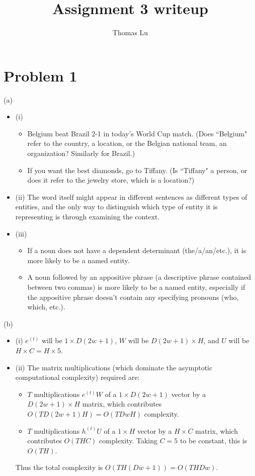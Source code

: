 \documentclass{article}
\title{Assignment 3 writeup}
\author{Thomas Lu}
\date{}
\begin{document}
\maketitle
\section{Problem 1}
(a)

\begin{itemize}
\item (i) 
\begin{itemize}
\item Belgium beat Brazil 2-1 in today's World Cup match. (Does ``Belgium" refer to the country, a location, or the Belgian national team, an organization? Similarly for Brazil.)
\item If you want the best diamonds, go to Tiffany. (Is ``Tiffany" a person, or does it refer to the jewelry store, which is a location?)
\end{itemize}
\item (ii) The word itself might appear in different sentences as different types of entities, and the only way to distinguish which type of entity it is representing is through examining the context.
\item (iii)
\begin{itemize}
\item If a noun does not have a dependent determinant (the/a/an/etc.), it is more likely to be a named entity.
\item A noun followed by an appositive phrase (a descriptive phrase contained between two commas) is more likely to be a named entity, especially if the appositive phrase doesn't contain any specifying pronouns (who, which, etc.).
\end{itemize}
\end{itemize}

(b)

\begin{itemize}
\item (i) $e^{(t)}$ will be $1 \times D(2w + 1)$, $W$ will be $D(2w+1) \times H$, and $U$ will be $H \times C = H \times 5$.
\item (ii) The matrix multiplications (which dominate the asymptotic computational complexity) required are:
\begin{itemize}
\item $T$ multiplications $e^{(t)}W$ of a $1 \times D(2w + 1)$ vector by a $D(2w + 1) \times H$ matrix, which contributes $O(TD(2w + 1)H) = O(TDwH)$ complexity.
\item $T$ multiplications $h^{(t)}U$ of a $1 \times H$ vector by a $H \times C$ matrix, which contributes $O(THC)$ complexity. Taking $C=5$ to be constant, this is $O(TH)$.
\end{itemize}
Thus the total complexity is $O(TH(Dw + 1)) = O(THDw)$.
\end{itemize}
\end{document}
